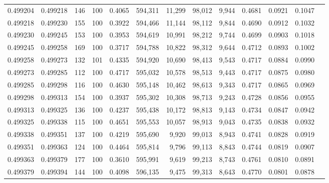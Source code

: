 \begin{tabular}{rrrrrrrrrrrrr}
0.499204 & 0.499218 &   146 & 100 &                                     0.4065 & 594,311 &  11,299 &  98,012 &   9,944 & 0.4681 & 0.0921 & 0.1047 \\
0.499218 & 0.499230 &   155 & 100 &                                     0.3922 & 594,466 &  11,144 &  98,112 &   9,844 & 0.4690 & 0.0912 & 0.1032 \\
0.499230 & 0.499245 &   153 & 100 &                                     0.3953 & 594,619 &  10,991 &  98,212 &   9,744 & 0.4699 & 0.0903 & 0.1018 \\
0.499245 & 0.499258 &   169 & 100 &                                     0.3717 & 594,788 &  10,822 &  98,312 &   9,644 & 0.4712 & 0.0893 & 0.1002 \\
0.499258 & 0.499273 &   132 & 101 &                                     0.4335 & 594,920 &  10,690 &  98,413 &   9,543 & 0.4717 & 0.0884 & 0.0990 \\
0.499273 & 0.499285 &   112 & 100 &                                     0.4717 & 595,032 &  10,578 &  98,513 &   9,443 & 0.4717 & 0.0875 & 0.0980 \\
0.499285 & 0.499298 &   116 & 100 &                                     0.4630 & 595,148 &  10,462 &  98,613 &   9,343 & 0.4717 & 0.0865 & 0.0969 \\
0.499298 & 0.499313 &   154 & 100 &                                     0.3937 & 595,302 &  10,308 &  98,713 &   9,243 & 0.4728 & 0.0856 & 0.0955 \\
0.499313 & 0.499325 &   136 & 100 &                                     0.4237 & 595,438 &  10,172 &  98,813 &   9,143 & 0.4734 & 0.0847 & 0.0942 \\
0.499325 & 0.499338 &   115 & 100 &                                     0.4651 & 595,553 &  10,057 &  98,913 &   9,043 & 0.4735 & 0.0838 & 0.0932 \\
0.499338 & 0.499351 &   137 & 100 &                                     0.4219 & 595,690 &   9,920 &  99,013 &   8,943 & 0.4741 & 0.0828 & 0.0919 \\
0.499351 & 0.499363 &   124 & 100 &                                     0.4464 & 595,814 &   9,796 &  99,113 &   8,843 & 0.4744 & 0.0819 & 0.0907 \\
0.499363 & 0.499379 &   177 & 100 &                                     0.3610 & 595,991 &   9,619 &  99,213 &   8,743 & 0.4761 & 0.0810 & 0.0891 \\
0.499379 & 0.499394 &   144 & 100 &                                     0.4098 & 596,135 &   9,475 &  99,313 &   8,643 & 0.4770 & 0.0801 & 0.0878 \\

\end{tabular}

